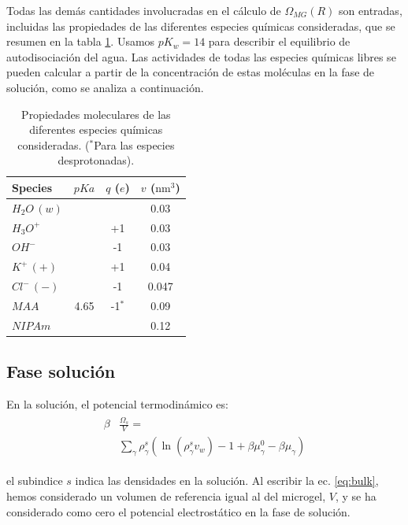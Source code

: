 Todas las dem\'as cantidades involucradas en el c\'alculo de $\Omega_{MG}(R)$ son entradas, incluidas las propiedades de las diferentes especies qu\'imicas consideradas, que se resumen en la tabla \ref{table:molecules}.
Usamos $pK_w=14$ para describir el equilibrio de autodisociaci\'on del agua.
Las actividades de todas las especies qu\'imicas libres se pueden calcular a partir de la concentración de estas mol\'eculas en la fase de soluci\'on, como se analiza a continuaci\'on.


\begin{table}
	\centering
\begin{tabular}{|lccc|}
    \hline
    {Species} & {$pKa$} & {$q$ ($e$)} & {$v$ ($\text{nm}^3$)} \\
      \hline
$H_2O\,(w)$ & ~ & ~ & 0.03\\
$H_3O^+$ & ~ & +1 & 0.03\\
$OH^-$ & ~ & -1 & 0.03\\
$K^+\,(+)$ & ~ & +1 & 0.04\\ 
$Cl^-\,(-)$ & ~ & -1 & 0.047\\
$MAA$ & 4.65 & -1$^\ast$ & 0.09\\
$NIPAm$ & ~ & ~ & 0.12\\
    \hline
  \end{tabular}
 \caption{Propiedades moleculares de las diferentes especies qu\'imicas consideradas.
 	\footnotesize ($^\ast$Para las especies desprotonadas).}
\label{table:molecules} 
\end{table}


\subsection{Fase soluci\'on}

En la soluci\'on, el potencial termodin\'amico es:
%
%
\begin{align}
\begin{aligned}
\beta&\frac{\Omega_s}{V}=\\& \sum_{\gamma   } {\rho^s_\gamma\left(\ln(\rho_\gamma^sv_w) -1 + \beta\mu_\gamma^0 - \beta\mu_\gamma\right)}
\end{aligned}
\label{eq:bulk}
\end{align}

\noindent el subindice  $s$  indica las densidades en la soluci\'on.
Al escribir la ec. \ref{eq:bulk}, hemos considerado un volumen de referencia igual al del microgel, $V$, y se ha considerado como cero el potencial electrost\'atico en la fase de soluci\'on.


